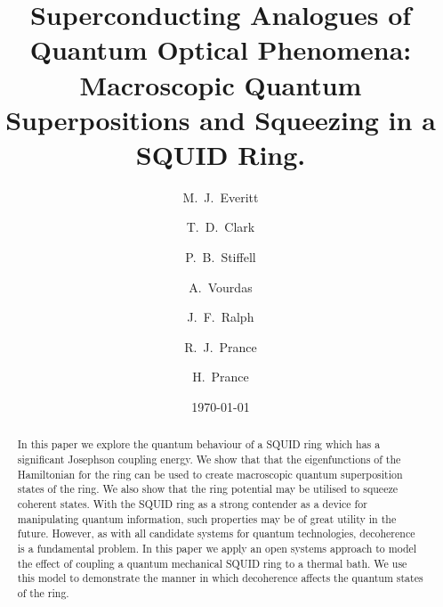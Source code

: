 \documentclass[twocolumn,a4paper,superscriptaddress,showpacs,floatfix,pra]{revtex4}
\begin{document}
\title{Superconducting Analogues of Quantum Optical Phenomena: Macroscopic
Quantum Superpositions and Squeezing in a SQUID Ring.}
\author{M.~J.~Everitt}
\author{T.~D.~Clark}
\author{P.~B.~Stiffell}
\author{A.~Vourdas}
\author{J.~F.~Ralph}
\author{R.~J.~Prance}
\author{H.~Prance}
\date{\today }

\begin{abstract}
In this paper  we explore the quantum behaviour of  a SQUID ring which
has a  significant Josephson  coupling energy. We  show that  that the
eigenfunctions of the  Hamiltonian for the ring can  be used to create
macroscopic  quantum superposition states  of the  ring. We  also show
that  the   ring  potential  may  be  utilised   to  squeeze  coherent
states. With  the SQUID  ring as  a strong contender  as a  device for
manipulating  quantum information,  such  properties may  be of  great
utility  in the  future. However,  as with  all candidate  systems for
quantum technologies,  decoherence is  a fundamental problem.  In this
paper  we  apply an  open  systems approach  to  model  the effect  of
coupling a  quantum mechanical  SQUID ring to  a thermal bath.  We use
this model to demonstrate the  manner in which decoherence affects the
quantum states of the ring.
\end{abstract}

\maketitle
\end{document}
